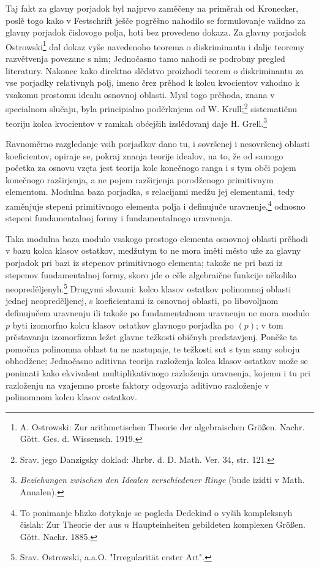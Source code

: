 \documentclass[11pt]{article}
\begin{document}
Taj fakt za glavny porjadok byl najprvo zaměčeny na priměrah od Kronecker, poslě togo kako v Festschrift ješče pogrěšno nahodilo se formulovanje validno za glavny porjadok čislovogo polja, hoti bez provedeno dokaza. Za glavny porjadok Ostrowski\footnote{A. Ostrowski: Zur arithmetischen Theorie der algebraischen Größen. Nachr. Gött. Ges. d. Wissensch. 1919.} dal dokaz vyše navedenoho teorema o diskriminantu i dalje teoremy razvětvenja povezane s nim; Jednočasno tamo nahodi se podrobny pregled literatury. Nakonec kako direktno slědstvo proizhodi teorem o diskriminantu za vse porjadky relativnyh polj, imeno črez prěhod k kolcu kvocientov vzhodno k vsakomu prostomu idealu osnovnoj oblasti. Mysl togo prěhoda, znana v specialnom slučaju, byla principialno podčrknjena od W. Krull;\footnote{Srav. jego Danzigsky doklad: Jhrbr. d. D. Math. Ver. 34, str. 121.} sistematičnu teoriju kolca kvocientov v ramkah obćejših izslědovanj daje H. Grell.\footnote{\emph{Beziehungen zwischen den Idealen verschiedener Ringe} (bude izidti v Math. Annalen).}

Ravnoměrno razgledanje vsih porjadkov dano tu, i sovršenej i nesovršenej oblasti koeficientov, opiraje se, pokraj znanja teorije idealov, na to, že od samogo početka za osnovu vzęta jest teorija kolc konečnogo ranga i s tym obči pojem konečnogo razširjenja, a ne pojem razširjenja porodženogo primitivnym elementom. Modulna baza porjadka, s relacijami medžu jej elementami, tedy zaměnjuje stepeni primitivnogo elementa polja i definujuče uravnenje,\footnote{To ponimanje blizko dotykaje se pogleda Dedekind o vyših kompleksnyh čislah: Zur Theorie der aus $n$ Haupteinheiten gebildeten komplexen Größen. Gött. Nachr. 1885.} odnosno stepeni fundamentalnoj formy i fundamentalnogo uravnenja.

Taka modulna baza modulo vsakogo prostogo elementa osnovnoj oblasti prěhodi v bazu kolca klasov ostatkov, medžutym to ne mora iměti město uže za glavny porjadok pri bazi iz stepenov primitivnogo elementa; takože ne pri bazi iz stepenov fundamentalnoj formy, skoro jde o cěle algebraične funkcije několiko neopreděljenyh.\footnote{Srav. Ostrowski, a.a.O. "Irregularität erster Art".} Drugymi slovami: kolco klasov ostatkov polinomnoj oblasti jednej neopreděljenej, s koeficientami iz osnovnoj oblasti, po libovoljnom definujučem uravnenju ili takože po fundamentalnom uravnenju ne mora modulo $p$ byti izomorfno kolcu klasov ostatkov glavnogo porjadka po $(p)$; v tom prěstavanju izomorfizma ležet glavne težkosti običnyh predstavjenj. Poněže ta pomočna polinomna oblast tu ne nastupaje, te težkosti sut s tym samy soboju obhodžene; Jednočasno aditivna teorija razloženja kolca klasov ostatkov može se ponimati kako ekvivalent multiplikativnogo razloženja uravnenja, kojemu i tu pri razloženju na vzajemno proste faktory odgovarja aditivno razloženje v polinomnom kolcu klasov ostatkov.
\end{document}
